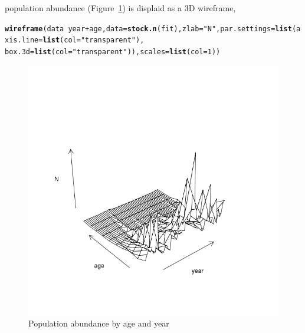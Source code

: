 \documentclass[a4paper,english,10pt]{article}\usepackage[]{graphicx}\usepackage[]{color}
\makeatletter
\def\maxwidth{ %
  \ifdim\Gin@nat@width>\linewidth
    \linewidth
  \else
    \Gin@nat@width
  \fi
}
\newcommand{\hlnum}[1]{\textcolor[rgb]{0.686,0.059,0.569}{#1}}%
\newcommand{\hlstr}[1]{\textcolor[rgb]{0.192,0.494,0.8}{#1}}%
\newcommand{\hlopt}[1]{\textcolor[rgb]{0,0,0}{#1}}%
\newcommand{\hlstd}[1]{\textcolor[rgb]{0.345,0.345,0.345}{#1}}%
\newcommand{\hlkwc}[1]{\textcolor[rgb]{0.333,0.667,0.333}{#1}}%
\newcommand{\hlkwd}[1]{\textcolor[rgb]{0.737,0.353,0.396}{\textbf{#1}}}%
\newenvironment{kframe}{%
 \def\at@end@of@kframe{}%
 \ifinner\ifhmode%
  \def\at@end@of@kframe{\end{minipage}}%
  \begin{minipage}{\columnwidth}%
 \fi\fi%
 \def\FrameCommand##1{\hskip\@totalleftmargin \hskip-\fboxsep
 \colorbox{shadecolor}{##1}\hskip-\fboxsep
     \hskip-\linewidth \hskip-\@totalleftmargin \hskip\columnwidth}%
 \MakeFramed {\advance\hsize-\width
   \@totalleftmargin\z@ \linewidth\hsize
   \@setminipage}}%
 {\par\unskip\endMakeFramed%
 \at@end@of@kframe}
\newenvironment{knitrout}{}{} %
\makeatother
\begin{document}
population abundance (Figure~\ref{fig:N}) is displaid as a 3D wireframe, 

\begin{knitrout}
\color{fgcolor}\begin{kframe}
\begin{alltt}
\hlkwd{wireframe}\hlstd{(data} \hlopt{~} \hlstd{year} \hlopt{+} \hlstd{age,} \hlkwc{data} \hlstd{=} \hlkwd{stock.n}\hlstd{(fit),} \hlkwc{zlab} \hlstd{=} \hlstr{"N"}\hlstd{,} \hlkwc{par.settings} \hlstd{=} \hlkwd{list}\hlstd{(}\hlkwc{axis.line} \hlstd{=} \hlkwd{list}\hlstd{(}\hlkwc{col} \hlstd{=} \hlstr{"transparent"}\hlstd{),}
    \hlkwc{box.3d} \hlstd{=} \hlkwd{list}\hlstd{(}\hlkwc{col} \hlstd{=} \hlstr{"transparent"}\hlstd{)),} \hlkwc{scales} \hlstd{=} \hlkwd{list}\hlstd{(}\hlkwc{col} \hlstd{=} \hlnum{1}\hlstd{))}
\end{alltt}
\end{kframe}\begin{figure}[H]

{\centering \includegraphics[width=\maxwidth]{figure/N-1} 

}

\caption[Population abundance by age and year]{Population abundance by age and year}\label{fig:N}
\end{figure}


\end{knitrout}
\end{document}
